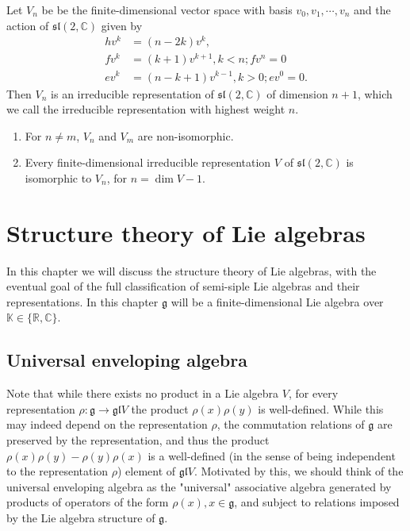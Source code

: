 \documentclass{report}
\begin{document}
\begin{theorem}
    Let $V_n$ be be the finite-dimensional vector space with basis $v_0, v_1, \cdots, v_n$ and the action of $\mathfrak{sl}(2, \mathbb C)$ given by
    \begin{align*}
        h v^k &= (n - 2k) v^k,\\
        f v^k &= (k+1) v^{k+1}, k < n; fv^n = 0\\
        e v^k &= (n - k + 1) v^{k-1}, k > 0; ev^0 = 0.        
    \end{align*}
    Then $V_n$ is an irreducible representation of $\mathfrak{sl}(2, \mathbb C)$ of dimension $n+1$, which we call the irreducible representation with highest weight $n$.
    \begin{enumerate}[label = (\roman*)]
        \item For $n \neq m$, $V_n$ and $V_m$ are non-isomorphic.
        \item Every finite-dimensional irreducible representation $V$ of $\mathfrak{sl}(2, \mathbb C)$ is isomorphic to $V_n$, for $n = \dim V - 1$.
    \end{enumerate}
\end{theorem}


\chapter{Structure theory of Lie algebras}
In this chapter we will discuss the structure theory of Lie algebras, with the eventual goal of the full classification of semi-siple Lie algebras and their representations.
In this chapter $\mathfrak g$ will be a finite-dimensional Lie algebra over $\mathbb K \in \{\mathbb R, \mathbb C\}$.
\section{Universal enveloping algebra}
Note that while there exists no product in a Lie algebra $V$, for every representation $\rho: \mathfrak g \to \mathfrak{gl}{V}$ the product $\rho(x) \rho(y)$ is well-defined.
While this may indeed depend on the representation $\rho$, the commutation relations of $\mathfrak g$ are preserved by the representation, and thus the product $\rho(x) \rho(y) - \rho(y) \rho(x)$ is a well-defined (in the sense of being independent to the representation $\rho$) element of $\mathfrak{gl}{V}$.
Motivated by this, we should think of the universal enveloping algebra as the "universal" associative algebra generated by products of operators of the form $\rho(x), x \in \mathfrak g$, and subject to relations imposed by the Lie algebra structure of $\mathfrak g$.
\end{document}
